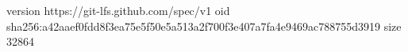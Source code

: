 version https://git-lfs.github.com/spec/v1
oid sha256:a42aaef0fdd8f3ea75e5f50e5a513a2f700f3e407a7fa4e9469ac788755d3919
size 32864
